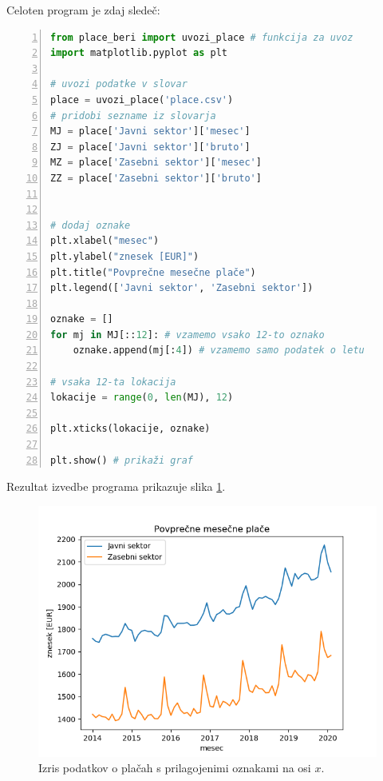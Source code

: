 Celoten program je zdaj sledeč:
\begin{lstlisting}[language=Python, showstringspaces=false,numbers=left]
from place_beri import uvozi_place # funkcija za uvoz
import matplotlib.pyplot as plt

# uvozi podatke v slovar
place = uvozi_place('place.csv')
# pridobi sezname iz slovarja
MJ = place['Javni sektor']['mesec']
ZJ = place['Javni sektor']['bruto']
MZ = place['Zasebni sektor']['mesec']
ZZ = place['Zasebni sektor']['bruto']


# dodaj oznake
plt.xlabel("mesec")
plt.ylabel("znesek [EUR]")
plt.title("Povprečne mesečne plače")
plt.legend(['Javni sektor', 'Zasebni sektor'])

oznake = []
for mj in MJ[::12]: # vzamemo vsako 12-to oznako
    oznake.append(mj[:4]) # vzamemo samo podatek o letu

# vsaka 12-ta lokacija
lokacije = range(0, len(MJ), 12) 

plt.xticks(lokacije, oznake)

plt.show() # prikaži graf
\end{lstlisting}
Rezultat izvedbe programa prikazuje slika \ref{img:plt5}.
\begin{figure}
    \includegraphics[width=\linewidth]{img/plt5.png}
    \caption{Izris podatkov o plačah s prilagojenimi oznakami na osi $x$.}
    \label{img:plt5}
\end{figure}

